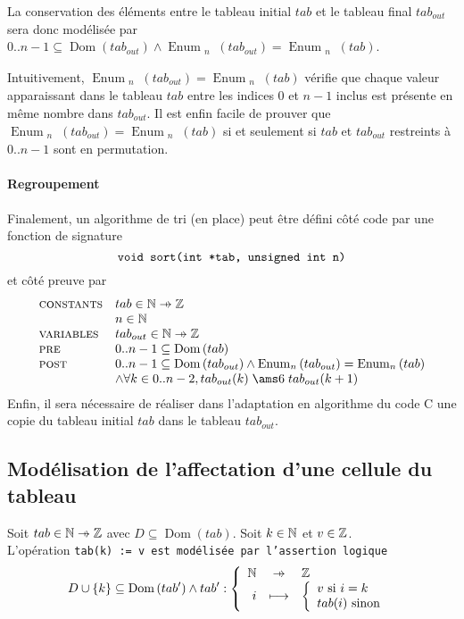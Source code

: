 \documentclass[a4paper, 11pt]{article}
\newcommand{\pto}{\mathrel{\ooalign{\hfil$\mapstochar$\hfil\cr$\to$\cr}}}
\DeclareMathOperator{\eenu}{Enum}
\DeclareMathOperator{\ddom}{Dom}
\newcommand{\dom}[1]{\ddom\left(#1\right)}
\newcommand{\enu}[2]{\eenu_{\substack{#1}}\left(#2\right)}
\theoremstyle{mystyle}
\begin{document}
La conservation des éléments entre le tableau initial $tab$ et le tableau final $tab_{out}$ sera donc modélisée par $0..n - 1 \subseteq \dom{tab_{out}} \land \enu{n}{tab_{out}} = \enu{n}{tab}$.

Intuitivement, $\enu{n}{tab_{out}} = \enu{n}{tab}$ vérifie que chaque valeur apparaissant dans le tableau $tab$ entre les indices $0$ et $n - 1$ inclus est présente en même nombre dans $tab_{out}$. Il est enfin facile de prouver que $\enu{n}{tab_{out}} = \enu{n}{tab}$ si et seulement si $tab$ et $tab_{out}$ restreints à $0..n - 1$ sont en permutation.

\paragraph{Regroupement}\mbox{}

Finalement, un algorithme de tri (en place) peut être défini côté code par une fonction de signature
\[
    \text{\tt{void sort(int *tab, unsigned int n)}}
\]
et côté preuve par
\[
    \begin{array}{ll}
         \sc{constants}& tab \in \N \pto \Z \\
         & n \in \N \\
         \sc{variables}& tab_{out} \in \N \pto \Z \\
         \sc{pre} & 0..n - 1 \subseteq \dom{tab} \\
         \sc{post} & 0..n - 1 \subseteq \dom{tab_{out}} \land \enu{n}{tab_{out}} = \enu{n}{tab}\\
         &\land \forall k \in 0..n - 2, tab_{out}(k) \leq tab_{out}(k + 1)
    \end{array}
\]
Enfin, il sera nécessaire de réaliser dans l'adaptation en algorithme du code C une copie du tableau initial $tab$ dans le tableau $tab_{out}$.

\subsection{Modélisation de l'affectation d'une cellule du tableau}
Soit $tab \in \N \pto \Z$ avec $D \subseteq \dom{tab}$. Soit $k \in \N$ et $v \in \Z$.\\
L'opération \tt{tab(k) := v} est modélisée par l'assertion logique
\[
    D \cup \{k\} \subseteq \dom{tab'} \land tab' : \left\{\begin{array}{rcl}
    \N &\pto& \Z \\
    i &\lsto& \left\{\begin{array}{l}
         v\text{ si }i = k\\
         tab(i)\text{ sinon} 
    \end{array}\right. 
\end{array}\right.
\]
\end{document}
